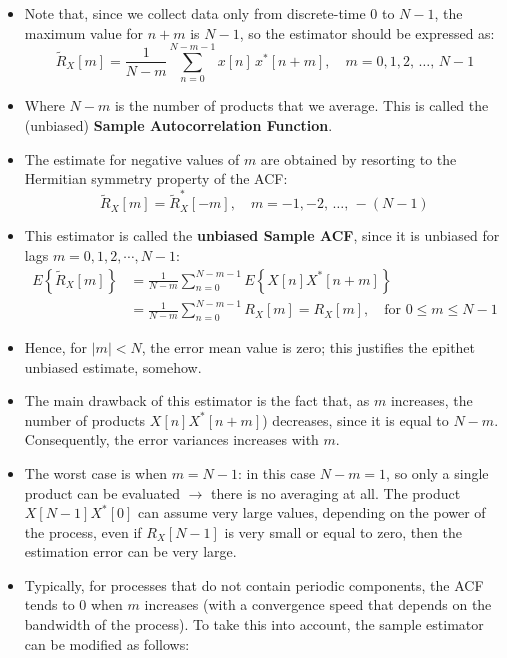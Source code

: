 \begin{itemize}
\[
R_X[m] \triangleq E\left\{ X[n] X^*[n+m] \right\}
\implies
\hat{R}_X[m] = \frac{1}{N} \sum_{n=0}^{N-1} x[n]\, x^*[n+m]
\]
\item Note that, since we collect data only from discrete-time \(0\) to \(N-1\), the maximum value for \(n+m\) is \(N-1\), so the estimator should be expressed as:
\[
\tilde{R}_X[m] = \frac{1}{N-m} \sum_{n=0}^{N-m-1} x[n]\, x^*[n+m],\quad m = 0, 1, 2,\,\dots,\, N-1
\]
\item Where \(N-m\) is the number of products that we average. This is called the (unbiased) \textbf{Sample Autocorrelation Function}.
\item The estimate for negative values of \(m\) are obtained by resorting to the Hermitian symmetry property of the ACF:
\[
\tilde{R}_X[m] = \tilde{R}_X^*[-m],\quad m = -1, -2,\, \dots,\, -(N-1)
\]
\item This estimator is called the \textbf{unbiased Sample ACF}, since it is unbiased for lags \(m=0,1,2,\cdots,N-1\):
\[
\begin{aligned}
E\left\{ \tilde{R}_X[m] \right\}
&= \frac{1}{N-m} \sum_{n=0}^{N-m-1} E\left\{ X[n] X^*[n+m] \right\}
\\[2ex]
&= \frac{1}{N-m} \sum_{n=0}^{N-m-1} R_X[m] = R_X[m], \quad \text{for } 0 \leq m \leq N-1
\end{aligned}
\]
\item Hence, for \(|m|<N\), the error mean value is zero; this justifies the epithet unbiased estimate, somehow.
\item The main drawback of this estimator is the fact that, as \(m\) increases, the number of products \(X[n]X^*[n+m]\)) decreases, since it is equal to \(N-m\). Consequently, the error variances increases with \(m\).
\item The worst case is when \(m=N-1\): in this case \(N-m=1\), so only  a single product can be evaluated \(\rightarrow\) there is no averaging at all. The product \(X[N-1]X^*[0]\) can assume very large values, depending on the power of the process, even if \(R_X[N-1]\) is very small or equal to zero, then the estimation error can be very large.
\item Typically, for processes that do not contain periodic components, the ACF tends to 0 when \(m\) increases (with a convergence speed that depends on the bandwidth of the process). To take this into account, the sample estimator can be modified as follows:


\end{itemize}
